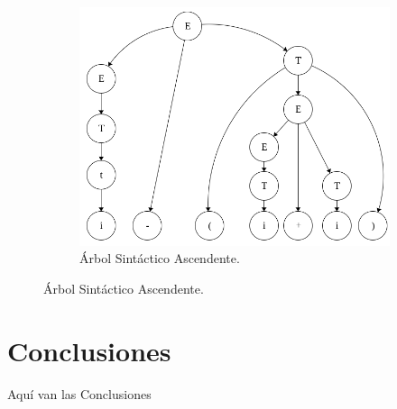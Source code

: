 \documentclass[letterpaper]{article}
\begin{document}
\begin{figure}[H]
    \centering
    \begin{subfigure}{0.45\textwidth}
        \includegraphics[width=\textwidth]{img/arbol_sint}
        \caption*{Árbol Sintáctico Ascendente.}
    \end{subfigure}
\end{figure}

\section{Conclusiones}
Aquí van las Conclusiones
\end{document}
